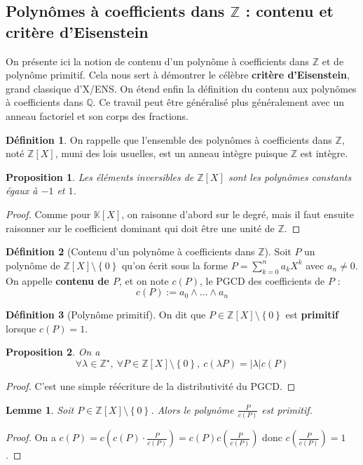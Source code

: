 \documentclass[french]{book}
\newcommand{\Z}{\mathbb{Z}}
\newcommand{\Q}{\mathbb{Q}}
\newcommand{\K}{\mathbb{K}}
\newcommand{\st}{^\star}
\theoremstyle{plain}
\newtheorem{lem}{Lemme}[chapter]
\newtheorem{prop}{Proposition}[chapter]
\theoremstyle{definition}
\newtheorem{dfn}{Définition}[chapter]
\theoremstyle{remark}
\begin{document}
\subsection{Polynômes à coefficients dans $\Z$ : contenu et critère d'Eisenstein}
On présente ici la notion de contenu d'un polynôme à coefficients dans $\Z$ et de polynôme primitif. Cela nous sert à démontrer le célèbre \textbf{critère d'Eisenstein}, grand classique d'X/ENS. On étend enfin la définition du contenu aux polynômes à coefficients dans $\Q$. Ce travail peut être généralisé plus généralement avec un anneau factoriel et son corps des fractions.
\begin{dfn}
	On rappelle que l'ensemble des polynômes à coefficients dans $\Z$, noté $\Z[X]$, muni des lois usuelles, est un anneau intègre puisque $\Z$ est intègre.
\end{dfn}
\begin{prop}
	Les éléments inversibles de $\Z[X]$ sont les polynômes constants égaux à $-1$ et $1$.
\end{prop}
\begin{proof}
	Comme pour $\K[X]$, on raisonne d'abord sur le degré, mais il faut ensuite raisonner sur le coefficient dominant qui doit être une unité de $\Z$.
\end{proof}
\begin{dfn}[Contenu d'un polynôme à coefficients dans $\Z$]
	Soit $P$ un polynôme de $\Z[X]\setminus\left\{0\right\}$ qu'on écrit sous la forme $P=\displaystyle\sum_{k=0}^{n}a_kX^k$ avec $a_n\ne0$. On appelle \textbf{contenu de $P$}, et on note $c(P)$, le PGCD des coefficients de $P$ : $$c(P):=a_0\wedge\ldots\wedge a_n$$
\end{dfn}
\begin{dfn}[Polynôme primitif]
	On dit que $P\in\Z[X]\setminus\left\{0\right\}$ est \textbf{primitif} lorsque $c(P)=1$.
\end{dfn}
\begin{prop}
	On a $$\forall \lambda\in\Z\st,\ \forall P\in\Z[X]\setminus\left\{0\right\},\ c(\lambda P)=\lvert\lambda\rvert c(P)$$
\end{prop}
\begin{proof}
	C'est une simple réécriture de la distributivité du PGCD.
\end{proof}
\begin{lem}
	Soit $P\in\Z[X]\setminus\left\{0\right\}$. Alors le polynôme $\displaystyle\frac{P}{c(P)}$ est primitif.
\end{lem}
\begin{proof}
	On a $\displaystyle c(P)=c\left(c(P)\cdot\frac{P}{c(P)}\right)=c(P)c\left(\frac{P}{c(P)}\right)$ donc $\displaystyle c\left(\frac{P}{c(P)}\right)=1$.
\end{proof}
\end{document}
